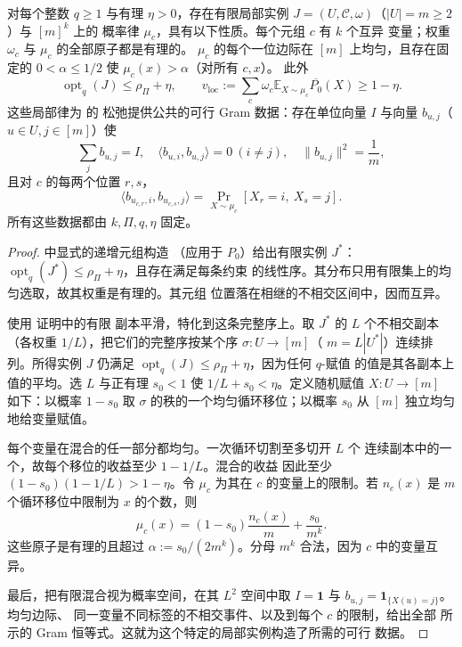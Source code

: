 \begin{lemma}[有理局部排序数据]\label{lem:ordering-local-data}
对每个整数 \(q\ge1\) 与有理 \(\eta>0\)，存在有限局部实例
\(J=(U,\mathcal C,\omega)\)（\(|U|=m\ge2\)）与 \([m]^k\) 上的
概率律 \(\mu_c\)，具有以下性质。每个元组 \(c\) 有 \(k\) 个互异
变量；权重 \(\omega_c\) 与 \(\mu_c\) 的全部原子都是有理的。
\(\mu_c\) 的每个一位边际在 \([m]\) 上均匀，且存在固定的
\(0<\alpha\le1/2\) 使 \(\mu_c(x)>\alpha\)（对所有 \(c,x\)）。
此外
\begin{equation}
 \operatorname{opt}_q(J)\le\rho_\Pi+\eta,\qquad
 v_{\mathrm{loc}}:=
 \sum_c\omega_c\mathbb E_{X\sim\mu_c}\overline{P_0}(X)
 \ge1-\eta.
\label{eq:ordering-local-gap}
\end{equation}
这些局部律为 \cite[Section~8.3]{GuruswamiEtAl2011OrderingCSP} 的
松弛提供公共的可行 Gram 数据：存在单位向量 \(I\) 与向量
\(b_{u,j}\)（\(u\in U,j\in[m]\)）使
\[
 \sum_j b_{u,j}=I,\quad
 \langle b_{u,i},b_{u,j}\rangle=0\ (i\ne j),\quad
 \|b_{u,j}\|^2=\frac1m,
\]
且对 \(c\) 的每两个位置 \(r,s\)，
\begin{equation}
 \langle b_{u_{c,r},i},b_{u_{c,s},j}\rangle
 =\Pr_{X\sim\mu_c}[X_r=i,\ X_s=j].
\label{eq:ordering-local-moments}
\end{equation}
所有这些数据都由 \(k,\Pi,q,\eta\) 固定。
\end{lemma}

\begin{proof}
\cite[Theorem~11.1, Definition~11.2, and the proof of
Theorem~2.5]{GuruswamiEtAl2011OrderingCSP} 中显式的递增元组构造
（应用于 \(P_0\)）给出有限实例 \(J^*\)：
\(\operatorname{opt}_q(J^*)\le\rho_\Pi+\eta\)，且存在满足每条约束
的线性序。其分布只用有限集上的均匀选取，故其权重是有理的。其元组
位置落在相继的不相交区间中，因而互异。

使用 \cite[Lemma~8.9]{GuruswamiEtAl2011OrderingCSP} 证明中的有限
副本平滑，特化到这条完整序上。取 \(J^*\) 的 \(L\) 个不相交副本
（各权重 \(1/L\)），把它们的完整序按某个序 \(\sigma:U\to[m]\)（
\(m=L|U^*|\)）连续排列。所得实例 \(J\) 仍满足
\(\operatorname{opt}_q(J)\le\rho_\Pi+\eta\)，因为任何 \(q\)-赋值
的值是其各副本上值的平均。选 \(L\) 与正有理 \(s_0<1\) 使
\(1/L+s_0<\eta\)。定义随机赋值 \(X:U\to[m]\) 如下：以概率
\(1-s_0\) 取 \(\sigma\) 的秩的一个均匀循环移位；以概率 \(s_0\)
从 \([m]\) 独立均匀地给变量赋值。

每个变量在混合的任一部分都均匀。一次循环切割至多切开 \(L\) 个
连续副本中的一个，故每个移位的收益至少 \(1-1/L\)。混合的收益
因此至少 \((1-s_0)(1-1/L)>1-\eta\)。令 \(\mu_c\) 为其在 \(c\)
的变量上的限制。若 \(n_c(x)\) 是 \(m\) 个循环移位中限制为 \(x\)
的个数，则
\[
 \mu_c(x)=(1-s_0)\frac{n_c(x)}m+\frac{s_0}{m^k}.
\]
这些原子是有理的且超过 \(\alpha:=s_0/(2m^k)\)。分母 \(m^k\)
合法，因为 \(c\) 中的变量互异。

最后，把有限混合视为概率空间，在其 \(L^2\) 空间中取
\(I=\mathbf1\) 与 \(b_{u,j}=\mathbf1_{\{X(u)=j\}}\)。均匀边际、
同一变量不同标签的不相交事件、以及到每个 \(c\) 的限制，给出全部
所示的 Gram 恒等式。这就为这个特定的局部实例构造了所需的可行
数据。
\end{proof}

